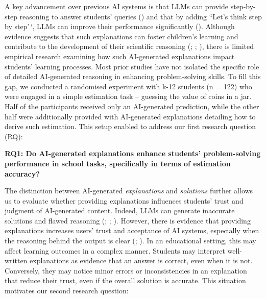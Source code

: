 \documentclass[
  12pt,
]{article}
\begin{document}
A key advancement over previous AI systems is that LLMs can provide step-by-step reasoning to answer students' queries () and that by adding ``Let's think step by step'\,`, LLMs can improve their performance significantly (). Although evidence suggests that such explanations can foster children's learning and contribute to the development of their scientific reasoning (; ; ), there is limited empirical research examining how such AI-generated explanations impact students' learning processes. Most prior studies have not isolated the specific role of detailed AI-generated reasoning in enhancing problem-solving skills. To fill this gap, we conducted a randomised experiment with k-12 students (n = 122) who were engaged in a simple estimation task -- guessing the value of coins in a jar. Half of the participants received only an AI-generated prediction, while the other half were additionally provided with AI-generated explanations detailing how to derive such estimation. This setup enabled to address our first research question (RQ):

\textbf{RQ1: Do AI-generated explanations enhance students' problem-solving performance in school tasks, specifically in terms of estimation accuracy?}

The distinction between AI-generated \emph{explanations} and \emph{solutions} further allows us to evaluate whether providing explanations influences students' trust and judgment of AI-generated content. Indeed, LLMs can generate inaccurate solutions and flawed reasoning (; ; ). However, there is evidence that providing explanations increases users' trust and acceptance of AI systems, especially when the reasoning behind the output is clear (; ). In an educational setting, this may affect learning outcomes in a complex manner. Students may interpret well-written explanations as evidence that an answer is correct, even when it is not. Conversely, they may notice minor errors or inconsistencies in an explanation that reduce their trust, even if the overall solution is accurate. This situation motivates our second research question:
\end{document}
